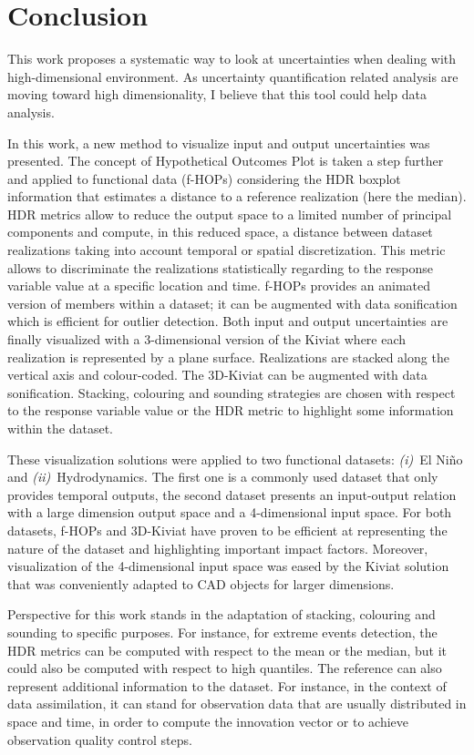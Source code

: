 \section{Conclusion}\label{sec:visu_ccl}

This work proposes a systematic way to look at uncertainties when dealing with high-dimensional environment. As uncertainty quantification related analysis are moving toward high dimensionality, I believe that this tool could help data analysis.

In this work, a new method to visualize input and output uncertainties  was presented. The concept of Hypothetical Outcomes Plot is taken a step further and applied to functional data (f-HOPs) considering the HDR boxplot information that estimates a distance to a reference realization (here the median). HDR metrics allow to reduce the output space to a limited number of principal components and compute, in this reduced space, a distance between dataset realizations taking into account temporal or spatial discretization. This metric allows to discriminate the realizations statistically regarding to the response variable value at a specific location and time. f-HOPs provides an animated version of members within a dataset; it can be augmented with data sonification which is efficient for outlier detection. Both input and output uncertainties are finally visualized with a 3-dimensional version of the Kiviat where each realization is represented by a plane surface. Realizations are stacked along the vertical axis and colour-coded. The 3D-Kiviat can be augmented with data sonification. Stacking, colouring and sounding strategies are chosen with respect to the response variable value or the HDR metric to highlight some information within the dataset.  

These visualization solutions were applied to two functional datasets: \emph{(i)}~El Niño and \emph{(ii)}~Hydrodynamics. The first one is a commonly used dataset that only provides temporal outputs, the second dataset presents an input-output relation with a large dimension output space and a 4-dimensional input space. For both datasets, f-HOPs and 3D-Kiviat have proven to be efficient at representing the nature of the dataset and highlighting important impact factors. Moreover, visualization of the 4-dimensional input space was eased by the Kiviat solution that was conveniently adapted to CAD objects for larger dimensions. 

Perspective for this work stands in the adaptation of stacking, colouring and sounding to specific purposes. For instance, for extreme events detection, the HDR metrics can be computed with respect to the mean or the median, but it could also be computed with respect to high quantiles.
The reference can also represent additional information to the dataset. For instance, in the context of data assimilation, it can stand for observation data that are usually distributed in space and time, in order to compute the innovation vector or to achieve observation quality control steps.

